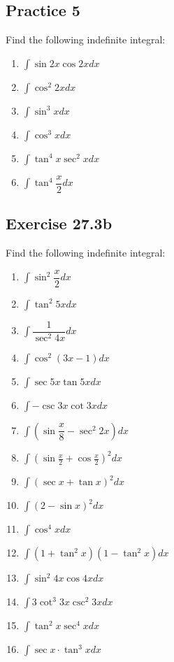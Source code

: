 \documentclass{report}
\begin{document}
\subsection{Practice 5}
Find the following indefinite integral:
\begin{enumerate}
    \item $\displaystyle\int\sin2x\cos2x dx$
    \item $\displaystyle\int\cos^2 2x dx$
    \item $\displaystyle\int\sin^3 x dx$
    \item $\displaystyle\int\cos^3 x dx$
    \item $\displaystyle\int\tan^4 x\sec^2 x dx$
    \item $\displaystyle\int\tan^4\dfrac{x}{2} dx$
\end{enumerate}

\subsection{Exercise 27.3b}
Find the following indefinite integral:
\begin{enumerate}
    \item $\displaystyle\int\sin^2\dfrac{x}{2} dx$
    \item $\displaystyle\int\tan^2 5x dx$
    \item $\displaystyle\int\dfrac{1}{\sec^2 4x} dx$
    \item $\displaystyle\int\cos^2(3x - 1) dx$
    \item $\displaystyle\int\sec5x\tan5x dx$
    \item $\displaystyle\int-\csc3x\cot3x dx$
    \item $\displaystyle\int\left(\sin\dfrac{x}{8} - \sec^2 2x\right) dx$
    \item $\displaystyle\int\left(\sin{\frac{x}{2}}+\cos{\frac{x}{2}}\right)^{2} dx$
    \item $\displaystyle\int(\sec x+\tan x)^{2} dx$
    \item $\displaystyle\int(2-\sin x)^{2} dx$
    \item $\displaystyle\int\cos^4 x dx$
    \item $\displaystyle\int\left(1+\tan^{2}x\right)\left(1-\tan^{2}x\right) dx$
    \item $\displaystyle\int\sin^{2}4x\cos4x dx$
    \item $\displaystyle\int3\cot^{3}3x\csc^{2}3x dx$
    \item $\displaystyle\int\tan^{2}x\sec^{4}x dx$
    \item $\displaystyle\int\sec x\cdot\tan^{3}x dx$
\end{enumerate}
\end{document}

